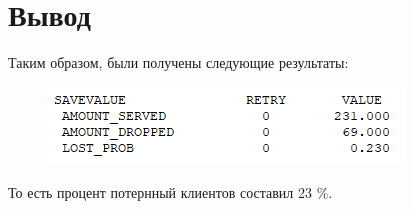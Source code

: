 \documentclass[12pt,a4paper,oneside]{report}
\begin{document}
\clearpage
\newpage

\section*{Вывод}
\quad Таким образом, были получены следующие результаты: 

\begin{figure}[!h]
	\centering
	\includegraphics[scale=1]{3.png}
	\label{fig:screenshot006}
\end{figure}

\quad То есть процент потернный клиентов составил 23 \%.
\end{document}
